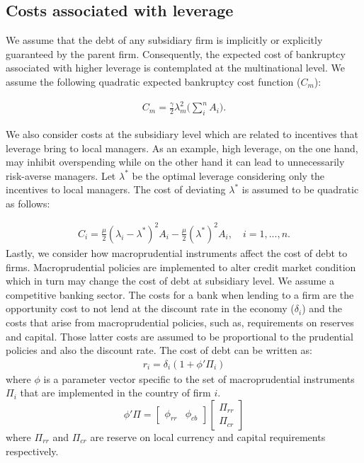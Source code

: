 \documentclass[12pt]{article}
\begin{document}
	\subsection{Costs associated with leverage}
	\label{subsec:costs}
	We assume that the debt of any subsidiary firm is implicitly or explicitly guaranteed by the parent firm. Consequently, the expected cost of bankruptcy associated with higher leverage is contemplated at the multinational level. We assume the following quadratic expected bankruptcy cost function ($C_m$):
	
	\begin{equation}
	\begin{aligned}
	C_m=\frac{\gamma}{2}\lambda_m^2\bigg(\sum_{i}^{n}A_i\bigg).
	\end{aligned}
	\label{eq:cost bankruptcy}
	\end{equation}
	
	We also consider costs at the subsidiary level which are related to incentives that leverage bring to local managers. As an example, high leverage, on the one hand, may inhibit overspending while on the other hand it can lead to unnecessarily risk-averse managers. Let $\lambda^*$ be the optimal leverage considering only the incentives to local managers. The cost of deviating $\lambda^*$ is assumed to be quadratic as follows:  
	
	\begin{equation}
	\begin{aligned}
	C_i=\frac{\mu}{2}(\lambda_i-\lambda^*)^2A_i-\frac{\mu}{2}(\lambda^*)^2A_i, \quad i=1,...,n.
	\end{aligned}
	\label{eq:agency cost}
	\end{equation}
	Lastly, we consider how macroprudential instruments affect the cost of debt to firms. Macroprudential policies are implemented to alter credit market condition which in turn may change the cost of debt at subsidiary level. We assume a competitive banking sector. The costs for a bank when lending to a firm are the opportunity cost to not lend at the discount rate in the economy ($\delta_i$) and the costs that arise from macroprudential policies, such as, requirements on reserves and capital. Those latter costs are assumed to be proportional to the prudential policies and also the discount rate. The cost of debt can be written as:
	\begin{equation}
	\begin{aligned}
	r_i=\delta_i(1+\phi'\Pi_i)
	\end{aligned}
	\label{eq:cost of debt}
	\end{equation}
	where $\phi$ is a parameter vector specific to the set of macroprudential instruments $\Pi_i$ that are implemented in the country of firm $i$. 
	\begin{equation}
	\phi'\Pi=\begin{bmatrix}
	\phi_{rr} &  \phi_{cb}
	\end{bmatrix}
	\begin{bmatrix}
	\Pi_{rr} \\   
	\Pi_{cr} 
	\end{bmatrix}
	\label{eq:phi vector}
	\end{equation}
	where $\Pi_{rr}$ and $\Pi_{cr}$ are reserve on local currency and capital requirements respectively.
\end{document}
